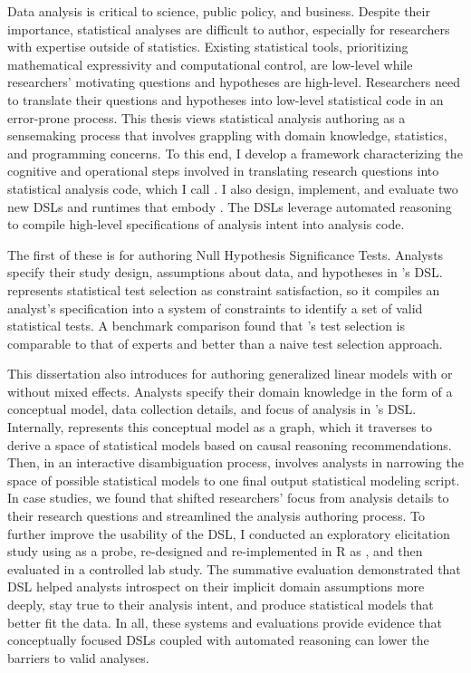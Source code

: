 Data analysis is critical to science, public policy, and business. Despite their
importance, statistical analyses are difficult to author, especially for
researchers with expertise outside of statistics. Existing statistical tools,
prioritizing mathematical expressivity and computational control, are low-level
while researchers' motivating questions and hypotheses are high-level.
Researchers need to translate their questions and hypotheses into low-level
statistical code in an error-prone process. 
This thesis views statistical analysis authoring as a sensemaking process that
involves grappling with domain knowledge, statistics, and programming concerns.
To this end, I develop a framework characterizing the cognitive and operational
steps involved in translating research questions into statistical analysis code,
which I call \hypoForm. I also design, implement, and evaluate two new DSLs and
runtimes that embody \hypoForm. The DSLs leverage automated reasoning to compile
high-level specifications of analysis intent into analysis code.

The first of these is \tea for authoring Null Hypothesis Significance
Tests. Analysts specify their study design, assumptions about data, and
hypotheses in \tea's DSL. \tea represents statistical test selection as
constraint satisfaction, so it compiles an analyst's specification into a system
of constraints to identify a set of valid statistical tests. A benchmark
comparison found that \tea's test selection is comparable to that of experts and
better than a naive test selection approach. 

This dissertation also introduces \tisane for authoring generalized linear
models with or without mixed effects. Analysts specify their domain knowledge in
the form of a conceptual model, data collection details, and focus of analysis
in \tisane's DSL. Internally, \tisane represents this conceptual model as a
graph, which it traverses to derive a space of statistical models based on
causal reasoning recommendations. Then, in an interactive disambiguation
process, \tisane involves analysts in narrowing the space of possible
statistical models to one final output statistical modeling script. In case
studies, we found that \tisane shifted researchers' focus from analysis details
to their research questions and streamlined the analysis authoring process. To
further improve the usability of the \tisane DSL, I conducted an exploratory
elicitation study using \tisane as a probe, re-designed and re-implemented
\tisane in R as \rTisane, and then evaluated \rTisane in a controlled lab study.
The summative evaluation demonstrated that \rTisanes DSL helped analysts
introspect on their implicit domain assumptions more deeply, stay true to their
analysis intent, and produce statistical models that better fit the data. In
all, these systems and evaluations provide evidence that conceptually focused
DSLs coupled with automated reasoning can lower the barriers to valid analyses.


